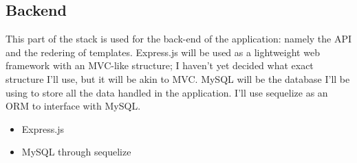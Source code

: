 \subsection{Backend}
This part of the stack is used for the back-end of the application:
namely the API and the redering of templates.
Express.js will be used as a lightweight web framework with an MVC-like structure;
I haven't yet decided what exact structure I'll use, but it will be akin to MVC.
MySQL will be the database I'll be using to store all the data handled in the application.
I'll use sequelize as an ORM to interface with MySQL.

\begin{itemize}
  \item Express.js 
  \item MySQL through sequelize
\end{itemize}
